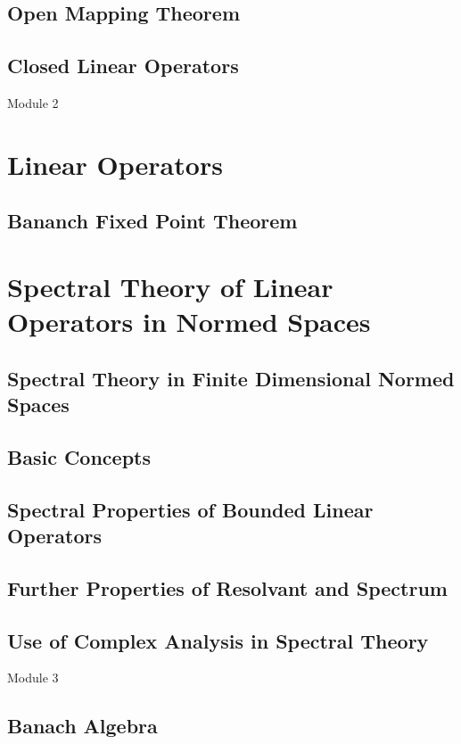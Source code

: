 \subsection{Open Mapping Theorem}
\subsection{Closed Linear Operators}
\pagebreak

{\Large Module 2}
\section{Linear Operators}
\subsection{Bananch Fixed Point Theorem}
\setcounter{section}{6}
\section{Spectral Theory of Linear Operators in Normed Spaces}
\subsection{Spectral Theory in Finite Dimensional Normed Spaces}
\subsection{Basic Concepts}
\subsection{Spectral Properties of Bounded Linear Operators}
\subsection{Further Properties of Resolvant and Spectrum}
\subsection{Use of Complex Analysis in Spectral Theory}
\pagebreak

{\Large Module 3}
\subsection{Banach Algebra}
